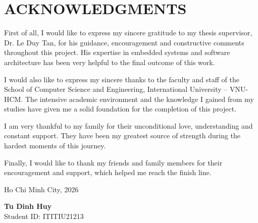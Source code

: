 \chapter*{ACKNOWLEDGMENTS}

First of all, I would like to express my sincere gratitude to my thesis supervisor, Dr. Le Duy Tan, for his guidance, encouragement and constructive comments throughout this project. His expertise in embedded systems and software architecture has been very helpful to the final outcome of this work.

I would also like to express my sincere thanks to the faculty and staff of the School of Computer Science and Engineering, International University -- VNU-HCM. The intensive academic environment and the knowledge I gained from my studies have given me a solid foundation for the completion of this project.

I am very thankful to my family for their unconditional love, understanding and constant support. They have been my greatest source of strength during the hardest moments of this journey.

Finally, I would like to thank my friends and family members for their encouragement and support, which helped me reach the finish line.

\bigskip
\noindent Ho Chi Minh City, 2026

\noindent \textbf{Tu Dinh Huy}\\
\noindent Student ID: ITITIU21213
